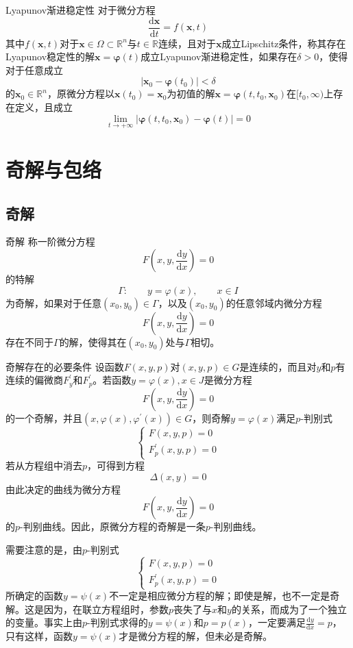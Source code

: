 \documentclass[lang = cn, scheme = chinese, thmcnt = section]{elegantbook}
\newcommand{\R}{\mathbb{R}}            %
\newcommand{\sub}{\subset}             %
\newcommand{\bs}{\boldsymbol}          %
\newcommand{\dd}{\mathrm{d}}           %
\begin{document}
\begin{definition}{Lyapunov渐进稳定性}
	对于微分方程%
	$$
	\frac{\dd \bs{x}}{\dd t}=f(\bs{x},t)
	$$
	其中$f(\bs{x},t)$对于$\bs{x}\in \Omega\sub\R^n$与$t\in\R$连续，且对于$\bs{x}$成立Lipschitz条件，称其存在Lyapunov稳定性的解$\bs{x}=\bs{\varphi}(t)$成立Lyapunov渐进稳定性，如果存在$\delta>0$，使得对于任意成立%
	$$
	|\bs{x}_0-\bs{\varphi}(t_0)|<\delta
	$$
	的$\bs{x}_0\in\R^n$，原微分方程以$\bs{x}(t_0)=\bs{x}_0$为初值的解$\bs{x}=\bs{\varphi}(t,t_0,\bs{x}_0)$在$[t_0,\infty)$上存在定义，且成立%
	$$
	\lim_{t\to+\infty}|\bs{\varphi}(t,t_0,\bs{x}_0)-\bs{\varphi}(t)|=0
	$$
\end{definition}

\section{奇解与包络}

\subsection{奇解}

\begin{definition}{奇解}
	称一阶微分方程
	$$
	F\left(x,y,\frac{\mathrm{d}y}{\mathrm{d}x}\right)=0
	$$
	的特解
	$$
	\Gamma:\qquad y=\varphi(x),\qquad x\in I
	$$
	为奇解，如果对于任意$(x_0,y_0)\in \Gamma$，以及$(x_0,y_0)$的任意邻域内微分方程
	$$
	F\left(x,y,\frac{\mathrm{d}y}{\mathrm{d}x}\right)=0
	$$
	存在不同于$\Gamma$的解，使得其在$(x_0,y_0)$处与$\Gamma$相切。
\end{definition}

\begin{theorem}{奇解存在的必要条件}
	设函数$F(x,y,p)$对$(x,y,p)\in G$是连续的，而且对$y$和$p$有连续的偏微商$F_y^{\prime}$和$F_p^{\prime}$。若函数$y=\varphi(x),x\in J$是微分方程
	$$
	F(x,y,\frac{\mathrm{d}y}{\mathrm{d}x})=0
	$$
	的一个奇解，并且$(x,\varphi(x),\varphi^{\prime}(x))\in G$，则奇解$y=\varphi(x)$满足$p$-判别式
	$$
	\begin{cases}F(x,y,p)=0\\F_p^{\prime}(x,y,p)=0\end{cases}
	$$
	若从方程组中消去$p$，可得到方程
	$$
	\Delta(x,y)=0
	$$
	由此决定的曲线为微分方程
	$$
	F(x,y,\frac{\mathrm{d}y}{\mathrm{d}x})=0
	$$
	的$p$-判别曲线。因此，原微分方程的奇解是一条$p$-判别曲线。
\end{theorem}

\begin{note}
	需要注意的是，由$p$-判别式
	$$
	\begin{cases}F(x,y,p)=0\\F_p^{\prime}(x,y,p)=0\end{cases}
	$$
	所确定的函数$y=\psi(x)$不一定是相应微分方程的解；即使是解，也不一定是奇解。这是因为，在联立方程组时，参数$p$丧失了与$x$和$y$的关系，而成为了一个独立的变量。事实上由$p$-判别式求得的$y=\psi(x)$和$p=p(x)$，一定要满足$\frac{\mathrm{d}y}{\mathrm{d}x}=p$，只有这样，函数$y=\psi(x)$才是微分方程的解，但未必是奇解。
\end{note}
\end{document}

